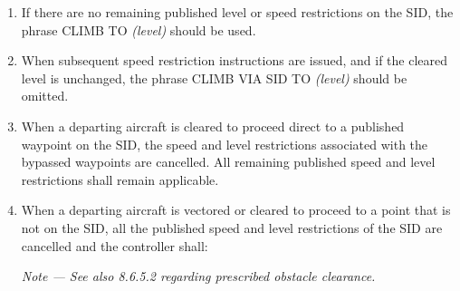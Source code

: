 \documentclass[../main.tex]{subfiles}
\begin{document}
\begin{enumerate}[itemsep=0.2cm]
\begin{enumerate}

            \item If there are no remaining published level or speed restrictions on the SID, the phrase CLIMB TO \textit{(level)} should be used.
            \item When subsequent speed restriction instructions are issued, and if the cleared level is unchanged, the phrase CLIMB VIA SID TO \textit{(level)} should be omitted.
            \item When a departing aircraft is cleared to proceed direct to a published waypoint on the SID, the speed and level restrictions associated with the bypassed waypoints are cancelled. All remaining published speed and level restrictions shall remain applicable.
            \item \label{6.3.2.4.5} When a departing aircraft is vectored or cleared to proceed to a point that is not on the SID, all the published speed and level restrictions of the SID are cancelled and the controller shall:

            
            \textit{Note --- See also 8.6.5.2 regarding prescribed obstacle clearance.}


\end{enumerate}
\end{enumerate}
\end{document}
